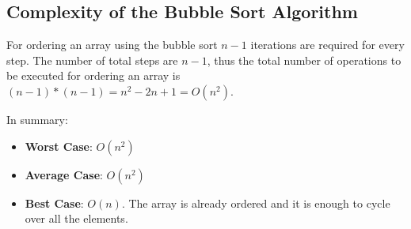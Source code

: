 \subsection{Complexity of the Bubble Sort Algorithm}
For ordering an array using the bubble sort \(n - 1\) iterations are required for every step. The number of total steps are \(n - 1\), thus the total number of operations to be executed for ordering an array is \((n - 1)*(n - 1) = n^{2} - 2n + 1 = O(n^{2})\).

In summary:
\begin{itemize}
\item \textbf{Worst Case}: \(O(n^{2})\)
\item \textbf{Average Case}: \(O(n^{2})\)
\item \textbf{Best Case}: \(O(n)\). The array is already ordered and it is enough to cycle over all the elements.
\end{itemize} 


